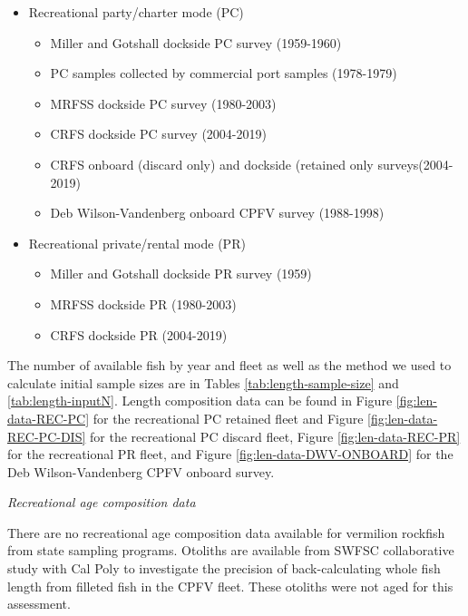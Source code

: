 \documentclass[
  english,
  a4paper,
]{article}
\providecommand{\tightlist}{%
  \setlength{\itemsep}{0pt}\setlength{\parskip}{0pt}}
\begin{document}
\begin{itemize}
\tightlist
\item
  Recreational party/charter mode (PC)

  \begin{itemize}
  \tightlist
  \item
    Miller and Gotshall dockside PC survey (1959-1960)
  \item
    PC samples collected by commercial port samples (1978-1979)
  \item
    MRFSS dockside PC survey (1980-2003)\\
  \item
    CRFS dockside PC survey (2004-2019)
  \item
    CRFS onboard (discard only) and dockside (retained only surveys(2004-2019)
  \item
    Deb Wilson-Vandenberg onboard CPFV survey (1988-1998)
  \end{itemize}
\item
  Recreational private/rental mode (PR)

  \begin{itemize}
  \tightlist
  \item
    Miller and Gotshall dockside PR survey (1959)
  \item
    MRFSS dockside PR (1980-2003)
  \item
    CRFS dockside PR (2004-2019)
  \end{itemize}
\end{itemize}

The number of available fish by year and fleet as well as the method we used to
calculate initial sample sizes are in Tables \ref{tab:length-sample-size} and \ref{tab:length-inputN}.
Length composition data can be found in Figure
\ref{fig:len-data-REC-PC} for the recreational PC retained fleet and Figure \ref{fig:len-data-REC-PC-DIS} for
the recreational PC discard fleet, Figure \ref{fig:len-data-REC-PR} for the recreational PR fleet, and Figure \ref{fig:len-data-DWV-ONBOARD} for the Deb Wilson-Vandenberg CPFV onboard survey.

\emph{Recreational age composition data}

There are no recreational age composition data available for vermilion rockfish from state
sampling programs.
Otoliths are available from SWFSC collaborative study with Cal Poly to investigate
the precision of back-calculating whole fish length from filleted fish in the CPFV fleet.
These otoliths were not aged for this assessment.
\end{document}
